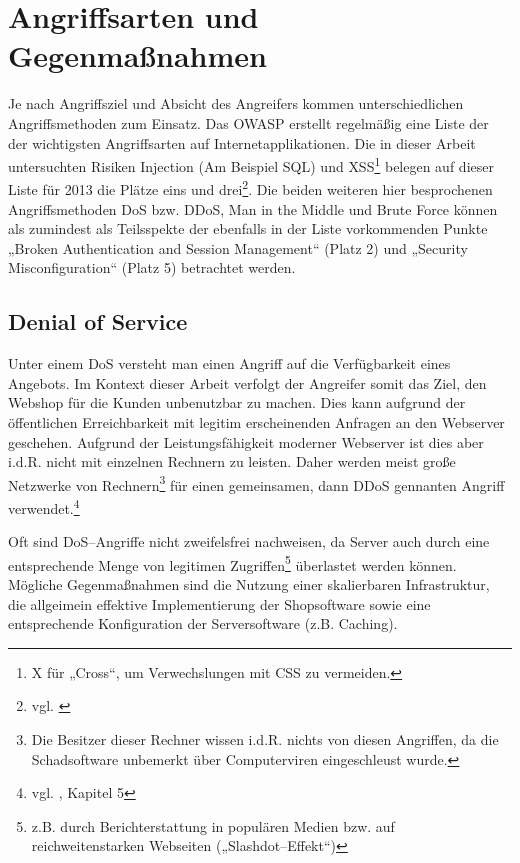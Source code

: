 \section{Angriffsarten und Gegenmaßnahmen}
\label{sec:hauptteil}

Je nach Angriffsziel und Absicht des Angreifers kommen unterschiedlichen Angriffsmethoden zum Einsatz. Das \ac{OWASP} erstellt regelmäßig eine Liste der der wichtigsten Angriffsarten auf Internetapplikationen. Die in dieser Arbeit untersuchten Risiken Injection (Am Beispiel \ac{SQL}) und \acs{XSS}\footnote{X für „Cross“, um Verwechslungen mit \ac{CSS} zu vermeiden.} belegen auf dieser Liste für 2013 die Plätze eins und drei\footnote{vgl. \cite{owasp}}. Die beiden weiteren hier besprochenen Angriffsmethoden \ac{DoS} bzw. \ac{DDoS}, Man in the Middle und Brute Force können als zumindest als Teilsspekte der ebenfalls in der Liste vorkommenden Punkte „Broken Authentication and Session Management“ (Platz 2) und „Security Misconfiguration“ (Platz 5) betrachtet werden.

\subsection{Denial of Service}

Unter einem \ac{DoS} versteht man einen Angriff auf die Verfügbarkeit eines Angebots. Im Kontext dieser Arbeit verfolgt der Angreifer somit das Ziel, den Webshop für die Kunden unbenutzbar zu machen. Dies kann aufgrund der öffentlichen Erreichbarkeit mit legitim erscheinenden Anfragen an den Webserver geschehen. Aufgrund der Leistungsfähigkeit moderner Webserver ist dies aber i.d.R. nicht mit einzelnen Rechnern zu leisten. Daher werden meist große Netzwerke von Rechnern\footnote{Die Besitzer dieser Rechner wissen i.d.R. nichts von diesen Angriffen, da die Schadsoftware unbemerkt über Computerviren eingeschleust wurde.} für einen gemeinsamen, dann \ac{DDoS} gennanten Angriff verwendet.\footnote{vgl. \cite{carr}, Kapitel 5}

Oft sind \ac{DoS}--Angriffe nicht zweifelsfrei nachweisen, da Server auch durch eine entsprechende Menge von legitimen Zugriffen\footnote{z.B. durch Berichterstattung in populären Medien bzw. auf reichweitenstarken Webseiten („Slashdot--Effekt“)} überlastet werden können. Mögliche Gegenmaßnahmen sind die Nutzung einer skalierbaren Infrastruktur, die allgeimein effektive Implementierung der Shopsoftware sowie eine entsprechende Konfiguration der Serversoftware (z.B. Caching). 

